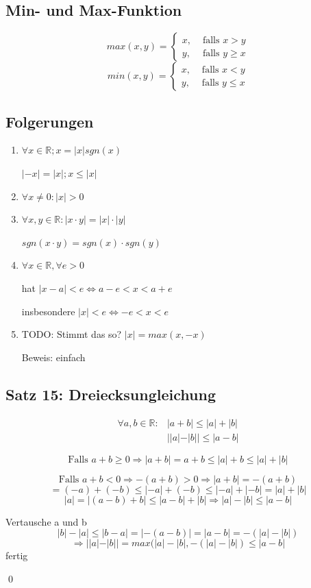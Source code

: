 \documentclass[fleqn]{scrbook}
\renewenvironment{proof}{{\bfseries Beweis }}{\qed}
\begin{document}
\subsection{Min- und Max-Funktion}

\[
  max(x,y) = \left\{ 
    \begin{array}{rl}
       x, & \text{ falls } x>y \\
       y, & \text{ falls } y\geq x
    \end{array}\right.
\]
\[
  min(x,y) = \left\{ 
    \begin{array}{rl}
       x, & \text{ falls } x<y \\
       y, & \text{ falls } y\leq x
    \end{array}\right.
\]

\subsection{Folgerungen}

\begin{enumerate}
  \item $\forall x \in \mathbb{R};x=|x|sgn(x)$
  
    $|-x|=|x|;x \leq |x|$
  \item $\forall x \neq 0: |x|>0$
  \item $\forall x,y \in \mathbb{R}: |x \cdot y|=|x| \cdot |y|$
  
    $sgn(x \cdot y)=sgn(x) \cdot sgn(y)$
  \item $\forall x \in \mathbb{R}, \forall e >0$
  
    hat $|x-a|<e \Longleftrightarrow a-e<x<a+e$
    
    insbesondere $|x|<e \Longleftrightarrow -e<x<e$
  \item TODO: Stimmt das so? $|x|=max(x,-x)$
  
        Beweis: einfach
\end{enumerate}

\subsection{Satz 15: Dreiecksungleichung}

\begin{align*}
  \forall a,b \in \mathbb{R}: & |a+b| \leq |a|+|b|\\
                              & ||a|-|b||\leq|a-b|
\end{align*}

\begin{proof}

\[\text{Falls } a+b \geq 0 \Longrightarrow |a+b|=a+b \leq |a|+b\leq|a|+|b|\]

\[\text{Falls } a+b < 0 \Longrightarrow -(a+b)>0 \Longrightarrow |a+b|=-(a+b)\]
\[=(-a)+(-b)\leq |-a|+(-b)\leq |-a|+ |-b|=|a|+|b|\]
\[|a|=|(a-b)+b|\leq|a-b|+|b|\Longrightarrow |a|-|b|\leq|a-b|\]

Vertausche a und b
\[|b|-|a|\leq |b-a|=|-(a-b)|=|a-b|=-(|a|-|b|)\]
\[\Longrightarrow||a|-|b||=max(|a|-|b|,-(|a|-|b|)\leq |a-b|\]
fertig

\end{proof}
\end{document}
